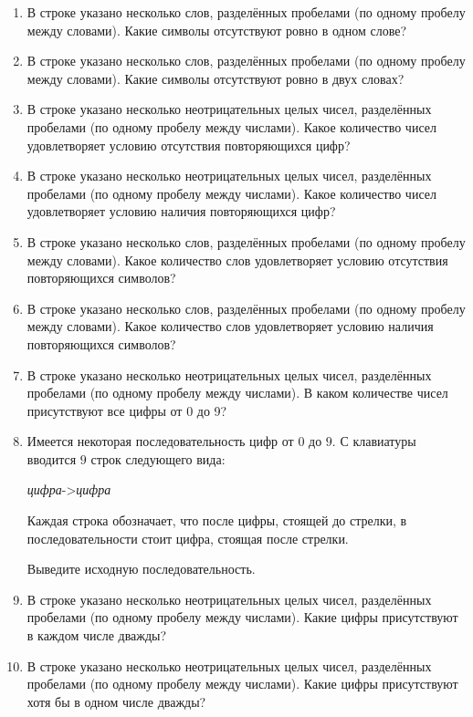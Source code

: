\begin{enumerate}
\item В строке указано несколько слов, разделённых пробелами (по одному
пробелу между словами). Какие символы отсутствуют ровно в одном слове?

\item В строке указано несколько слов, разделённых пробелами (по одному
пробелу между словами). Какие символы отсутствуют ровно в двух словах?

\item В строке указано несколько неотрицательных целых чисел, разделённых пробелами (по одному
пробелу между числами). Какое количество чисел удовлетворяет условию отсутствия
повторяющихся цифр? 

\item В строке указано несколько неотрицательных целых чисел, разделённых пробелами (по одному
пробелу между числами). Какое количество чисел удовлетворяет условию наличия
повторяющихся цифр? 

\item В строке указано несколько слов, разделённых пробелами (по одному
пробелу между словами). Какое количество слов удовлетворяет условию отсутствия
повторяющихся символов? 

\item В строке указано несколько слов, разделённых пробелами (по одному
пробелу между словами). Какое количество слов удовлетворяет условию наличия
повторяющихся символов? 

\item В строке указано несколько неотрицательных целых чисел, разделённых пробелами (по одному
пробелу между числами). В каком количестве чисел присутствуют все цифры от
0 до 9?

\item Имеется некоторая последовательность цифр от $0$ до $9$. 
С клавиатуры вводится $9$ строк следующего вида:

\textit{цифра}->\textit{цифра}

Каждая строка обозначает, что после цифры, стоящей до стрелки, в последовательности стоит цифра, стоящая после стрелки. 

Выведите исходную последовательность.

\item В строке указано несколько неотрицательных целых чисел, разделённых пробелами (по одному
пробелу между числами). Какие цифры присутствуют в каждом числе дважды?

\item В строке указано несколько неотрицательных целых чисел, разделённых пробелами (по одному
пробелу между числами). Какие цифры присутствуют хотя бы в одном числе дважды?


\end{enumerate}

